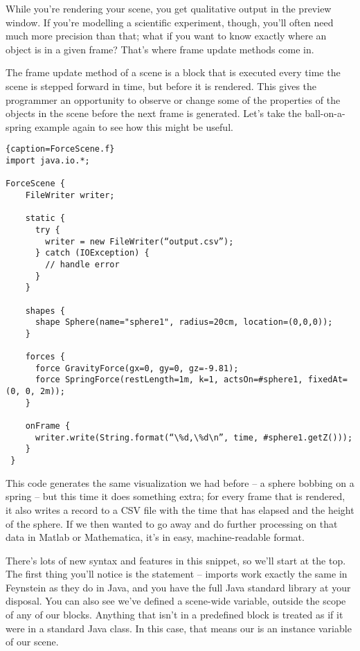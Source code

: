 While you're rendering your scene, you get qualitative output in the
preview window. If you're modelling a scientific experiment, though,
you'll often need much more precision than that; what if you want to
know exactly where an object is in a given frame? That's where frame
update methods come in.

The frame update method of a scene is a block that is executed every
time the scene is stepped forward in time, but before it is
rendered. This gives the programmer an opportunity to observe or
change some of the properties of the objects in the scene before the
next frame is generated. Let's take the ball-on-a-spring example again
to see how this might be useful.

\begin{lstlisting}{caption=ForceScene.f}
import java.io.*;

ForceScene {
    FileWriter writer;

    static {
      try {
        writer = new FileWriter(“output.csv”);
      } catch (IOException) {
        // handle error
      }
    }

    shapes {
      shape Sphere(name="sphere1", radius=20cm, location=(0,0,0));
    }

    forces {
      force GravityForce(gx=0, gy=0, gz=-9.81);
      force SpringForce(restLength=1m, k=1, actsOn=#sphere1, fixedAt=(0, 0, 2m));
    }

    onFrame {
      writer.write(String.format(“\%d,\%d\n”, time, #sphere1.getZ()));
    }
 }
\end{lstlisting}

This code generates the same visualization we had before -- a sphere
bobbing on a spring -- but this time it does something extra; for
every frame that is rendered, it also writes a record to a CSV file
with the time that has elapsed and the height of the sphere. If we
then wanted to go away and do further processing on that data in
Matlab or Mathematica, it's in easy, machine-readable format.

There's lots of new syntax and features in this snippet, so we'll
start at the top. The first thing you'll notice is the 
statement -- imports work exactly the same in Feynstein as they do in
Java, and you have the full Java standard library at your
disposal. You can also see we've defined a scene-wide variable,
outside the scope of any of our blocks. Anything that isn't in a
predefined block is treated as if it were in a standard Java class. In
this case, that means our  is an instance variable of our
scene.

